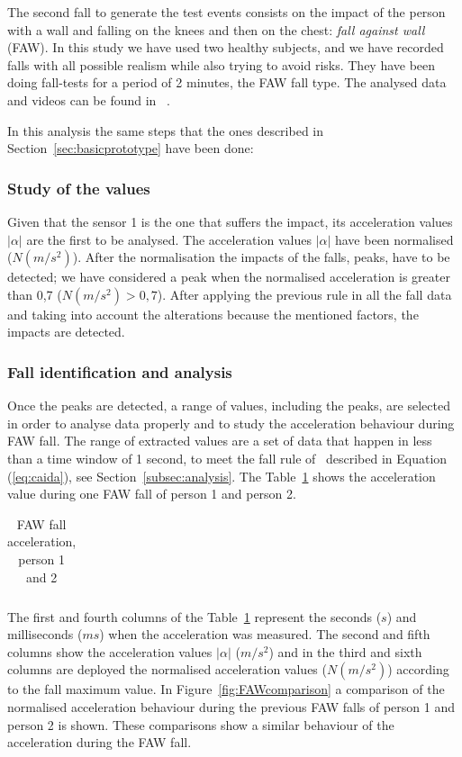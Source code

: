 \documentclass[journal]{IEEEtran}
\begin{document}
The second fall to generate the test events consists on the impact of the person with 
a wall and falling on the knees and then on the chest: \textit{fall against wall} (FAW). 
In this study we have used two healthy subjects, and we have recorded falls with all 
possible realism while also trying to avoid risks. They have been doing fall-tests for a period 
of 2 minutes, the FAW fall type. The analysed data and videos can be found in ~\cite{FallRepo}.

In this analysis the same steps that the ones described in Section~\ref{sec:basicprototype} 
have been done:

\subsubsection*{Study of the values} Given that the sensor 1 is the one that suffers the 
impact, its acceleration values $|\alpha|$ are the first to be
analysed. The acceleration values $|\alpha|$ have 
been normalised ($N(m/s^2)$). After the normalisation the impacts of the falls, peaks, 
have to be detected; we have considered a peak when the normalised acceleration is 
greater than 0,7 ($N(m/s^2) > 0,7$). After applying the previous rule in all the fall data 
and taking into account the alterations because the mentioned factors, the impacts are detected.

\subsubsection*{Fall identification and analysis} Once the peaks are detected, a range of values, 
including the peaks, are selected in order to analyse data properly and to study the acceleration 
behaviour during FAW fall. The range of extracted values are a set of data that happen in less 
than a time window of 1 second, to meet the fall rule of~\cite{Luder2009} described in 
Equation (\ref{eq:caida}), see Section~\ref{subsec:analysis}. The Table~\ref{tabla:FAW} shows the 
acceleration value during one FAW fall of person 1 and person 2. 

\begin{table}[!ht]
 \centering
 \begin{tabular}{*{5}{r}}
   
 \end{tabular}
 \caption{FAW fall acceleration, person 1 and 2}%
 \label{tabla:FAW}
\end{table}

The first and fourth columns of the Table~\ref{tabla:FAW} represent
the seconds ($s$) and milliseconds 
($ms$) when the acceleration was measured. The second and fifth columns show the acceleration 
values $|\alpha|$  ($m/s^2$) and in the third and sixth columns are deployed the normalised acceleration values 
($N(m/s^2)$) according to the fall maximum value. In Figure~\ref{fig:FAWcomparison} a comparison 
of the normalised acceleration behaviour during the previous FAW falls of person 1 and person 2 is 
shown. These comparisons show a similar behaviour of the acceleration during the FAW fall.
\end{document}
